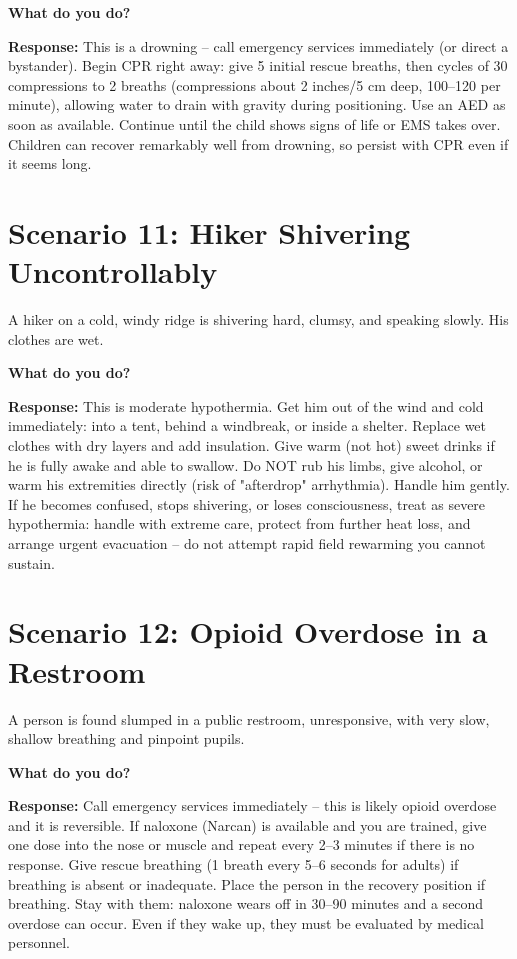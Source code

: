 \textbf{What do you do?}

\textbf{Response:} This is a drowning -- call emergency services immediately (or direct a bystander). Begin CPR right away: give 5 initial rescue breaths, then cycles of 30 compressions to 2 breaths (compressions about 2 inches/5 cm deep, 100--120 per minute), allowing water to drain with gravity during positioning. Use an AED as soon as available. Continue until the child shows signs of life or EMS takes over. Children can recover remarkably well from drowning, so persist with CPR even if it seems long.

\section{Scenario 11: Hiker Shivering Uncontrollably}

A hiker on a cold, windy ridge is shivering hard, clumsy, and speaking slowly. His clothes are wet.

\textbf{What do you do?}

\textbf{Response:} This is moderate hypothermia. Get him out of the wind and cold immediately: into a tent, behind a windbreak, or inside a shelter. Replace wet clothes with dry layers and add insulation. Give warm (not hot) sweet drinks if he is fully awake and able to swallow. Do NOT rub his limbs, give alcohol, or warm his extremities directly (risk of "afterdrop" arrhythmia). Handle him gently. If he becomes confused, stops shivering, or loses consciousness, treat as severe hypothermia: handle with extreme care, protect from further heat loss, and arrange urgent evacuation -- do not attempt rapid field rewarming you cannot sustain.

\section{Scenario 12: Opioid Overdose in a Restroom}

A person is found slumped in a public restroom, unresponsive, with very slow, shallow breathing and pinpoint pupils.

\textbf{What do you do?}

\textbf{Response:} Call emergency services immediately -- this is likely opioid overdose and it is reversible. If naloxone (Narcan) is available and you are trained, give one dose into the nose or muscle and repeat every 2--3 minutes if there is no response. Give rescue breathing (1 breath every 5--6 seconds for adults) if breathing is absent or inadequate. Place the person in the recovery position if breathing. Stay with them: naloxone wears off in 30--90 minutes and a second overdose can occur. Even if they wake up, they must be evaluated by medical personnel.

